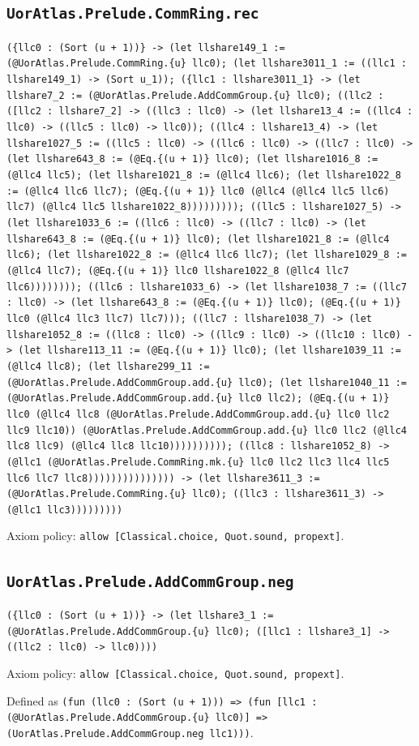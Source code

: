 \documentclass[11pt]{article}
\begin{document}
\subsection*{\texttt{UorAtlas.Prelude.CommRing.rec}}
\noindent\texttt{(\{llc0 : (Sort (u + 1))\} -> (let llshare149\_1 := (@UorAtlas.Prelude.CommRing.\{u\} llc0); (let llshare3011\_1 := ((llc1 : llshare149\_1) -> (Sort u\_1)); (\{llc1 : llshare3011\_1\} -> (let llshare7\_2 := (@UorAtlas.Prelude.AddCommGroup.\{u\} llc0); ((llc2 : ([llc2 : llshare7\_2] -> ((llc3 : llc0) -> (let llshare13\_4 := ((llc4 : llc0) -> ((llc5 : llc0) -> llc0)); ((llc4 : llshare13\_4) -> (let llshare1027\_5 := ((llc5 : llc0) -> ((llc6 : llc0) -> ((llc7 : llc0) -> (let llshare643\_8 := (@Eq.\{(u + 1)\} llc0); (let llshare1016\_8 := (@llc4 llc5); (let llshare1021\_8 := (@llc4 llc6); (let llshare1022\_8 := (@llc4 llc6 llc7); (@Eq.\{(u + 1)\} llc0 (@llc4 (@llc4 llc5 llc6) llc7) (@llc4 llc5 llshare1022\_8))))))))); ((llc5 : llshare1027\_5) -> (let llshare1033\_6 := ((llc6 : llc0) -> ((llc7 : llc0) -> (let llshare643\_8 := (@Eq.\{(u + 1)\} llc0); (let llshare1021\_8 := (@llc4 llc6); (let llshare1022\_8 := (@llc4 llc6 llc7); (let llshare1029\_8 := (@llc4 llc7); (@Eq.\{(u + 1)\} llc0 llshare1022\_8 (@llc4 llc7 llc6)))))))); ((llc6 : llshare1033\_6) -> (let llshare1038\_7 := ((llc7 : llc0) -> (let llshare643\_8 := (@Eq.\{(u + 1)\} llc0); (@Eq.\{(u + 1)\} llc0 (@llc4 llc3 llc7) llc7))); ((llc7 : llshare1038\_7) -> (let llshare1052\_8 := ((llc8 : llc0) -> ((llc9 : llc0) -> ((llc10 : llc0) -> (let llshare113\_11 := (@Eq.\{(u + 1)\} llc0); (let llshare1039\_11 := (@llc4 llc8); (let llshare299\_11 := (@UorAtlas.Prelude.AddCommGroup.add.\{u\} llc0); (let llshare1040\_11 := (@UorAtlas.Prelude.AddCommGroup.add.\{u\} llc0 llc2); (@Eq.\{(u + 1)\} llc0 (@llc4 llc8 (@UorAtlas.Prelude.AddCommGroup.add.\{u\} llc0 llc2 llc9 llc10)) (@UorAtlas.Prelude.AddCommGroup.add.\{u\} llc0 llc2 (@llc4 llc8 llc9) (@llc4 llc8 llc10)))))))))); ((llc8 : llshare1052\_8) -> (@llc1 (@UorAtlas.Prelude.CommRing.mk.\{u\} llc0 llc2 llc3 llc4 llc5 llc6 llc7 llc8))))))))))))))) -> (let llshare3611\_3 := (@UorAtlas.Prelude.CommRing.\{u\} llc0); ((llc3 : llshare3611\_3) -> (@llc1 llc3)))))))))}\par
\noindent Axiom policy: \texttt{allow [Classical.choice, Quot.sound, propext]}.\par
\subsection*{\texttt{UorAtlas.Prelude.AddCommGroup.neg}}
\noindent\texttt{(\{llc0 : (Sort (u + 1))\} -> (let llshare3\_1 := (@UorAtlas.Prelude.AddCommGroup.\{u\} llc0); ([llc1 : llshare3\_1] -> ((llc2 : llc0) -> llc0))))}\par
\noindent Axiom policy: \texttt{allow [Classical.choice, Quot.sound, propext]}.\par
\noindent Defined as \texttt{(fun (llc0 : (Sort (u + 1))) => (fun [llc1 : (@UorAtlas.Prelude.AddCommGroup.\{u\} llc0)] => (UorAtlas.Prelude.AddCommGroup.neg llc1)))}.\par
\end{document}
